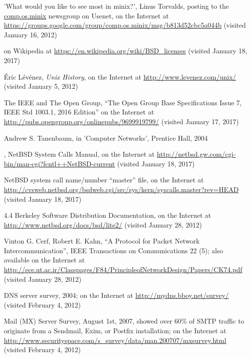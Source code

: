 \begin{thebibliography}{99}
'What would you like to see most in minix?',
Linus Torvalds, posting to the \url{comp.os.minix} newsgroup on Usenet, on
the Internet at
\url{https://groups.google.com/group/comp.os.minix/msg/b813d52cbc5a044b}
(visited January 16, 2012)

 on
Wikipedia at
\url{https://en.wikipedia.org/wiki/BSD\_licenses} (visited
January 18, 2017)

\'{E}ric L\'{e}v\'{e}nez, {\em Unix History}, on
the Internet at
\url{http://www.levenez.com/unix/} (visited January 5,
2012)

The IEEE and The Open Group, ``The Open Group Base
Specifications Issue 7, IEEE Std 1003.1, 2016 Edition'' on the Internet at
\url{http://pubs.opengroup.org/onlinepubs/9699919799/} (visited January 17,
2017)

Andrew S. Tanenbaum, in 'Computer Networks',
Prentice Hall, 2004

, NetBSD
System Calls Manual, on the Internet at
\url{http://netbsd.gw.com/cgi-bin/man-cgi?fcntl++NetBSD-current}
(visited January 18, 2017)

NetBSD system call name/number ``master'' file, on
the Internet at
\url{http://cvsweb.netbsd.org/bsdweb.cgi/src/sys/kern/syscalls.master?rev=HEAD}
(visited January 18, 2017)

4.4 Berkeley Software Distribution Documentation, on
the Internet at
\url{http://www.netbsd.org/docs/bsd/lite2/} (visited
January 28, 2012)

Vinton G. Cerf, Robert E. Kahn, ``A Protocol for
Packet Network Intercommunication'', IEEE Transactions on Communications 22 (5);
also available on the Internet at
\url{http://ece.ut.ac.ir/Classpages/F84/PrincipleofNetworkDesign/Papers/CK74.pdf}
(visited January 28, 2012)

DNS server survey, 2004; on the Internet at
\url{http://mydns.bboy.net/survey/} (visited February 4, 2012)

Mail (MX) Server Survey, August 1st, 2007, showed over
60\% of SMTP traffic to originate from a Sendmail, Exim, or Postfix
installation; on the Internet at
\url{http://www.securityspace.com/s\_survey/data/man.200707/mxsurvey.html}
(visited February 4, 2012)


\end{thebibliography}
